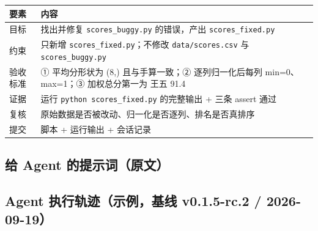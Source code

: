 {\def\LTcaptype{none} %
\begin{longtable}[]{@{}
  >{\raggedright\arraybackslash}p{}
  >{\raggedright\arraybackslash}p{}@{}}
\toprule\noalign{}
\begin{minipage}[b]{\linewidth}\raggedright
要素
\end{minipage} & \begin{minipage}[b]{\linewidth}\raggedright
内容
\end{minipage} \\
\midrule\noalign{}
\endhead
\bottomrule\noalign{}
\endlastfoot
目标 & 找出并修复 \texttt{scores\_buggy.py} 的错误，产出
\texttt{scores\_fixed.py} \\
约束 & 只新增 \texttt{scores\_fixed.py}；不修改 \texttt{data/scores.csv}
与 \texttt{scores\_buggy.py} \\
验收标准 & ① 平均分形状为 (8,) 且与手算一致；② 逐列归一化后每列
min=0、max=1；③ 加权总分第一为 王五 91.4 \\
证据 & 运行 \texttt{python\ scores\_fixed.py} 的完整输出 + 三条 assert
通过 \\
复核 & 原始数据是否被改动、归一化是否逐列、排名是否真排序 \\
提交 & 脚本 + 运行输出 + 会话记录 \\
\end{longtable}
}

\subsection{给 Agent
的提示词（原文）}\label{ux7ed9-agent-ux7684ux63d0ux793aux8bcdux539fux6587}

\begin{Shaded}
\begin{Highlighting}[]
\end{Highlighting}
\end{Shaded}

\subsection{Agent 执行轨迹（示例，基线 v0.1.5-rc.2 /
2026-09-19）}\label{agent-ux6267ux884cux8f68ux8ff9ux793aux4f8bux57faux7ebf-v0.1.5-rc.2-2026-09-19}

